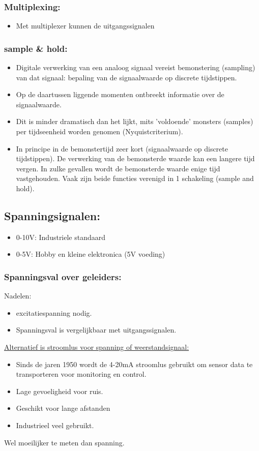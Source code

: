 \documentclass[12pt]{article}
\begin{document}
\subsubsection{Multiplexing:}
\begin{itemize}
    \item Met multiplexer kunnen de uitgangssignalen
\end{itemize}
\subsubsection{sample \& hold:}
\begin{itemize}
    \item Digitale verwerking van een analoog signaal vereist bemonstering (sampling) van dat signaal: bepaling van de signaalwaarde op discrete tijdstippen.
    \item Op de daartussen liggende momenten ontbreekt informatie over de signaalwaarde.
    \item Dit is minder dramatisch dan het lijkt, mits 'voldoende' monsters (samples) per tijdseenheid worden genomen (Nyquistcriterium).
    \item[] In principe in de bemonstertijd zeer kort (signaalwaarde op discrete tijdstippen). De verwerking van de bemonsterde waarde kan een langere tijd vergen. In zulke gevallen wordt de bemonsterde waarde enige tijd vastgehouden. Vaak zijn beide functies verenigd in 1 schakeling (sample and hold).
\end{itemize}
\subsection{Spanningsignalen:}
\begin{itemize}
    \item 0-10V: Industriele standaard
    \item 0-5V: Hobby en kleine elektronica (5V voeding)
\end{itemize}
\subsubsection{Spanningsval over geleiders:}
Nadelen:
\begin{itemize}
    \item excitatiespanning nodig.
    \item Spanningsval is vergelijkbaar met uitgangssignalen.
\end{itemize}
\underline{Alternatief is stroomlus voor spanning of weerstandsignaal:}
\begin{itemize}
    \item Sinds de jaren 1950 wordt de 4-20mA stroomlus gebruikt om sensor data te transporteren voor monitoring en control.
    \item Lage gevoeligheid voor ruis.
    \item Geschikt voor lange afstanden
    \item Industrieel veel gebruikt.
\end{itemize}
Wel moeilijker te meten dan spanning.
\end{document}
